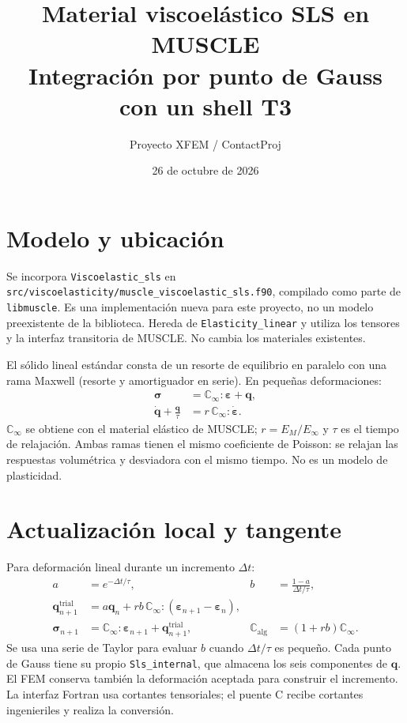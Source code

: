 \documentclass[10pt,a4paper]{article}
\title{Material viscoelástico SLS en MUSCLE\\\large Integración por punto de Gauss con un shell T3}
\author{Proyecto XFEM / ContactProj}
\date{26 de octubre de 2026}
\begin{document}
\sloppy
\maketitle
\section*{Modelo y ubicación}
Se incorpora \texttt{Viscoelastic\_sls} en
\texttt{src/viscoelasticity/muscle\_viscoelastic\_sls.f90}, compilado como parte de
\texttt{libmuscle}. Es una implementación nueva para este proyecto, no un modelo
preexistente de la biblioteca. Hereda de \texttt{Elasticity\_linear} y utiliza los
tensores y la interfaz transitoria de MUSCLE. No cambia los materiales existentes.

El sólido lineal estándar consta de un resorte de equilibrio en paralelo con una
rama Maxwell (resorte y amortiguador en serie). En pequeñas deformaciones:
\begin{align}
 \boldsymbol\sigma &= \mathbb C_\infty:\boldsymbol\varepsilon+\mathbf q,\\
 \dot{\mathbf q}+\frac{\mathbf q}{\tau}
 &= r\,\mathbb C_\infty:\dot{\boldsymbol\varepsilon}.
\end{align}
$\mathbb C_\infty$ se obtiene con el material elástico de MUSCLE;
$r=E_M/E_\infty$ y $\tau$ es el tiempo de relajación.
Ambas ramas tienen el mismo coeficiente de Poisson: se relajan las respuestas
volumétrica y desviadora con el mismo tiempo. No es un modelo de plasticidad.

\section*{Actualización local y tangente}
Para deformación lineal durante un incremento $\Delta t$:
\begin{align}
 a&=e^{-\Delta t/\tau}, & b&=\frac{1-a}{\Delta t/\tau},\\
 \mathbf q_{n+1}^{\mathrm{trial}}&=a\mathbf q_n+
 r b\,\mathbb C_\infty:(\boldsymbol\varepsilon_{n+1}-\boldsymbol\varepsilon_n),\\
 \boldsymbol\sigma_{n+1}&=\mathbb C_\infty:\boldsymbol\varepsilon_{n+1}
 +\mathbf q_{n+1}^{\mathrm{trial}}, &
 \mathbb C_{\mathrm{alg}}&=(1+rb)\mathbb C_\infty.
\end{align}
Se usa una serie de Taylor para evaluar $b$ cuando $\Delta t/\tau$ es pequeño.
Cada punto de Gauss tiene su propio \texttt{Sls\_internal}, que almacena los seis
componentes de $\mathbf q$. El FEM conserva también la deformación aceptada para
construir el incremento. La interfaz Fortran usa cortantes tensoriales; el puente C
recibe cortantes ingenieriles y realiza la conversión.
\end{document}
